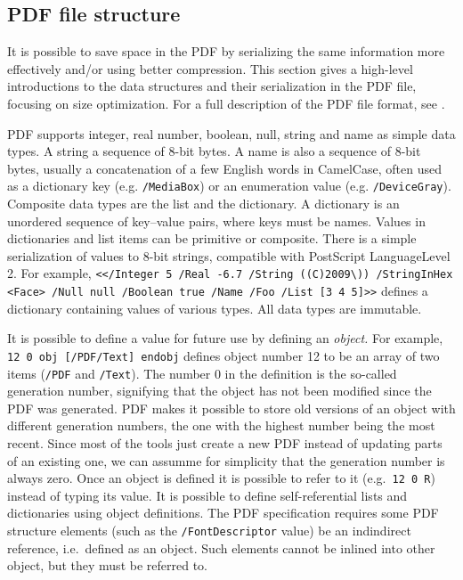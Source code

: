 \documentclass{ltugproc}
\begin{document}
\subsection{PDF file structure}

It is possible to save space in the PDF by serializing the same information
more effectively and/or using better compression. This section gives a
high-level introductions to the data structures and their serialization in
the PDF file, focusing on size optimization. For a full description of the
PDF file format, see \cite{pdfref}.

PDF supports integer, real number, boolean, null, string and name as
simple data types. A string a sequence of 8-bit bytes. A name is also a
sequence of 8-bit bytes, usually a concatenation of a few English words in
CamelCase, often used as a dictionary key (e.g. \texttt{/MediaBox}) or an
enumeration value (e.g. \texttt{/DeviceGray}). Composite data types are the
list and the dictionary. A dictionary is an unordered sequence of key--value
pairs, where keys must be names. Values in dictionaries and list items can
be primitive or composite. There is a simple serialization of values to
8-bit strings, compatible with PostScript LanguageLevel\,2. For example,
\texttt{\hbox{<}</Integer 5 /Real -6.7 /String ((C)2009\textbackslash))
/StringInHex <Face> /Null null
/Boolean true /Name /Foo /List [3 4 5]\hbox{>}>} defines a dictionary
containing values of various types. All data types are immutable.

It is possible to define a value for future use by defining an
\emph{object.} For example, \texttt{12 0 obj [/PDF/Text] endobj} defines
object number 12 to be an array of two items (\texttt{/PDF} and
\texttt{/Text}). The number 0 in the definition is the so-called generation
number, signifying that the object has not been modified since the PDF was
generated. PDF makes it possible to store old versions of an object with
different generation numbers, the one with the highest number being the most
recent. Since most of the tools just create a new PDF instead
of updating parts of an existing one, we can assumme for simplicity that the
generation number is always zero. Once an object is defined it is possible
to refer to it (e.g.\ \texttt{12 0 R}) instead of typing its value. It is
possible to define self-referential lists and dictionaries using object
definitions. The PDF specification requires some PDF structure elements
(such as the \texttt{/FontDescriptor} value) be an indindirect reference,
i.e.\ defined as an object. Such elements cannot be inlined into other
object, but they must be referred to.
\end{document}
